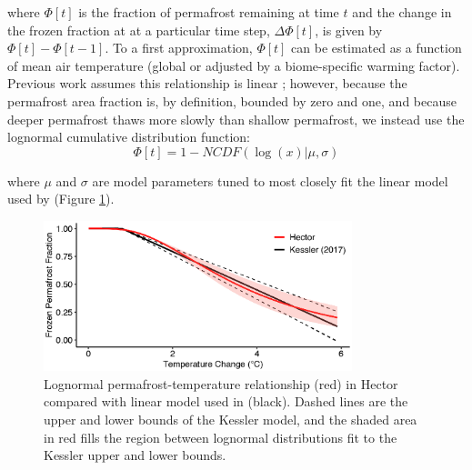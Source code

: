 \documentclass[essd, manuscript]{copernicus}
\begin{document}
where $\Phi[t]$ is the fraction of permafrost remaining at time $t$ and the change in the frozen fraction at at a particular time step, $\Delta \Phi[t]$, is given by $\Phi[t] - \Phi[t-1]$. To a first approximation, $\Phi[t]$ can be estimated as a function of mean air temperature (global or adjusted by a biome-specific warming factor). Previous work assumes this relationship is linear \citep{kessler_2017_estimating}; 
however, because the permafrost area fraction is, by definition, bounded by zero and one\footnotemark, and because deeper permafrost thaws more slowly than shallow permafrost, we instead use the lognormal cumulative distribution function: \begin{equation}
\Phi[t] = 1 - NCDF(\log(x) | \mu, \sigma)
\end{equation}

where $\mu$ and $\sigma$ are model parameters tuned to most closely fit the linear model used by \citet{kessler_2017_estimating} (Figure \ref{fig:kessler}). 



\begin{figure}
    \centering
    \includegraphics[width=0.8\textwidth]{figures/kessler_calibration.eps}
    \caption{Lognormal permafrost-temperature relationship (red) in Hector compared with linear model used in \citet{kessler_2017_estimating} (black). Dashed lines are the upper and lower bounds of the Kessler model, and the shaded area in red fills the region between lognormal distributions fit to the Kessler upper and lower bounds.}
    \label{fig:kessler}
\end{figure}
\end{document}
